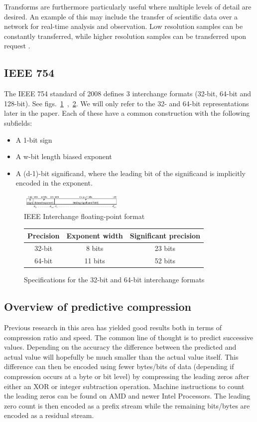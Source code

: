 \documentclass{acm_proc_article-sp}
\begin{document}
Transforms are furthermore particularly useful where multiple levels of detail are desired. An example of this may include the transfer of scientific data over a network 
for real-time analysis and observation. Low resolution samples can be constantly transferred, while higher resolution samples can be transferred upon request \cite{Tao:1994:PTS:951087.951108}.
\subsection{IEEE 754}
The IEEE 754 standard of 2008 defines 3 interchange formats (32-bit, 64-bit and 128-bit). See figs.~\ref{IEEE_FLOAT}~,~\ref{IEEE_FLOAT_TAB}. We will only refer to the 32- and 64-bit representations later in the paper.  
Each of these have a common construction with the following subfields:
\begin{itemize}
 \item A 1-bit sign
 \item A w-bit length biased exponent
 \item A (d-1)-bit significand, where the leading bit of the significand is implicitly encoded in the exponent.
\end{itemize}
\begin{figure}[h!]
 \centering
 \includegraphics[width=0.45\textwidth]{IEEEinterchangeFormat.png}
 \caption{IEEE Interchange floating-point format \cite{4610935}}
 \label{IEEE_FLOAT}
\end{figure}
\begin{figure}[h!]
\centering
\begin{tabular}{|c|c|c|}
 \hline
 Precision & Exponent width & Significant precision \\
 \hline
 32-bit & 8 bits & 23 bits \\
 \hline
 64-bit & 11 bits & 52 bits \\
 \hline
\end{tabular}
\caption{Specifications for the 32-bit and 64-bit interchange formats}
 \label{IEEE_FLOAT_TAB}
\end{figure}
\subsection{Overview of predictive compression}
Previous research \cite{1607248,4589203,engelson2000lossless,lindstrom2006fast,O'Neil:2011:FDC:1964179.1964189,4976448} in this area has yielded good results both in terms of compression ratio and speed. 
The common line of thought is to predict successive values. Depending on the accuracy the difference between the predicted and actual value will hopefully be much smaller than the actual value itself. 
This difference can then be encoded using fewer bytes/bits of data (depending if compression occurs at a byte or bit level) by compressing the leading zeros after either an XOR or integer subtraction 
operation. Machine instructions to count the leading zeros can be found on AMD and newer Intel Processors. The leading zero count is then encoded as a prefix stream while the remaining bits/bytes 
are encoded as a residual stream.
\end{document}
